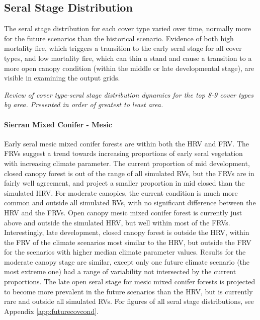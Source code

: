 \documentclass[12pt]{article}
\begin{document}
\begin{spacing}{1}
\subsection*{Seral Stage Distribution}
The seral stage distribution for each cover type varied over time, normally more for the future scenarios than the historical scenario. Evidence of both high mortality fire, which triggers a transition to the early seral stage for all cover types, and low mortality fire, which can thin a stand and cause a transition to a more open canopy condition (within the middle or late developmental stage), are visible in examining the output grids. %

\emph{Review of cover type-seral stage distribution dynamics for the top 8-9 cover types by area. Presented in order of greatest to least area.}



\paragraph{Sierran Mixed Conifer - Mesic} Early seral mesic mixed conifer forests are within both the HRV and FRV. The FRVs suggest a trend towards increasing proportions of early seral vegetation with increasing climate parameter. The current proportion of mid development, closed canopy forest is out of the range of all simulated RVs, but the FRVs are in fairly well agreement, and project a smaller proportion in mid closed than the simulated HRV. For moderate canopies, the current condition is much more common and outside all simulated RVs, with no significant difference between the HRV and the FRVs. Open canopy mesic mixed conifer forest is currently just above and outside the simulated HRV, but well within most of the FRVs. Interestingly, late development, closed canopy forest is outside the HRV, within the FRV of the climate scenarios most similar to the HRV, but outside the FRV for the scenarios with higher median climate parameter values. Results for the moderate canopy stage are similar, except only one future climate scenario (the most extreme one) had a range of variability not intersected by the current proportions. The late open seral stage for mesic mixed conifer forests is projected to become more prevalent in the future scenarios than the HRV, but is currently rare and outside all simulated RVs. For figures of all seral stage distributions, see Appendix \ref{app:futurecovcond}.


\end{spacing}
\end{document}
